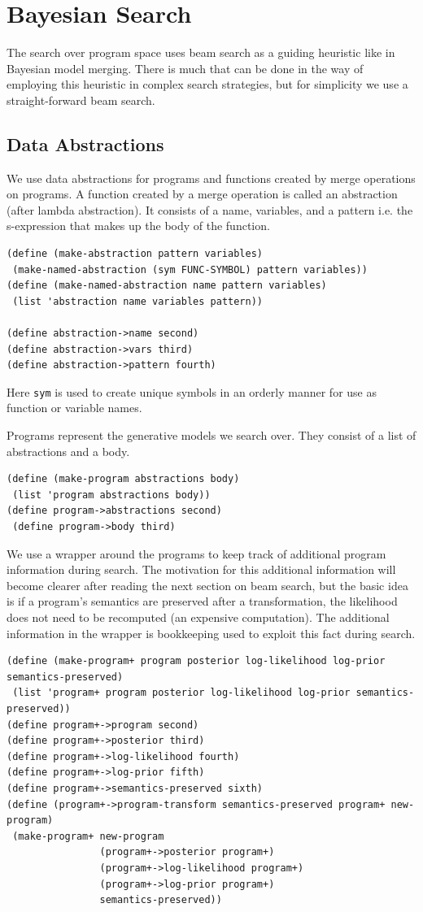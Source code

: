 \documentclass[a4paper,10pt]{article}
\begin{document}
\section{Bayesian Search}
The search over program space uses beam search as a guiding heuristic like in Bayesian model merging.  There is much that can be done in the way of employing this heuristic in complex search strategies, but for simplicity we use a straight-forward beam search.  

\subsection{Data Abstractions}
We use data abstractions for programs and functions created by merge operations on programs.  A function created by a merge operation is called an abstraction (after lambda abstraction).  It consists of a name, variables, and a pattern i.e. the s-expression that makes up the body of the function.  
\begin{lstlisting}[frame=trBL]
(define (make-abstraction pattern variables)
 (make-named-abstraction (sym FUNC-SYMBOL) pattern variables))
(define (make-named-abstraction name pattern variables)
 (list 'abstraction name variables pattern))

(define abstraction->name second)
(define abstraction->vars third)
(define abstraction->pattern fourth)
\end{lstlisting}
Here \texttt{sym} is used to create unique symbols in an orderly manner for use as function or variable names.


Programs represent the generative models we search over.  They consist of a list of abstractions and a body.
\begin{lstlisting}[frame=trBL]
(define (make-program abstractions body)
 (list 'program abstractions body))
(define program->abstractions second)
 (define program->body third)
\end{lstlisting}  

We use a wrapper around the programs to keep track of additional program information during search.  The motivation for this additional information will become clearer after reading the next section on beam search, but the basic idea is if a program's semantics are preserved after a transformation, the likelihood does not need to be recomputed (an expensive computation). The additional information in the wrapper is bookkeeping used to exploit this fact during search.  
\begin{lstlisting}[frame=trBL]
(define (make-program+ program posterior log-likelihood log-prior semantics-preserved)
 (list 'program+ program posterior log-likelihood log-prior semantics-preserved))
(define program+->program second)
(define program+->posterior third)
(define program+->log-likelihood fourth)
(define program+->log-prior fifth)
(define program+->semantics-preserved sixth)
(define (program+->program-transform semantics-preserved program+ new-program)
 (make-program+ new-program 
                (program+->posterior program+) 
                (program+->log-likelihood program+) 
                (program+->log-prior program+) 
                semantics-preserved))
\end{lstlisting}
\end{document}
